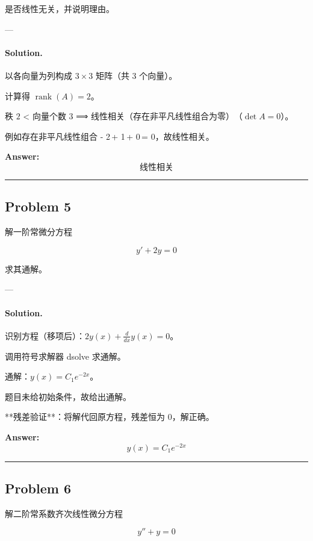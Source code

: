 \documentclass[12pt, a4paper]{article}
\newcommand{\problem}[1]{\subsection*{Problem #1}}
\newcommand{\solution}{\paragraph{Solution.}}
\begin{document}
是否线性无关，并说明理由。

---

\solution

以各向量为列构成 $3\times3$ 矩阵（共 3 个向量）。

计算得 $\operatorname{rank}(A) = 2$。

秩 $2$ < 向量个数 $3$ ⟹ 线性相关（存在非平凡线性组合为零）　（$\det A = 0$）。

例如存在非平凡线性组合 - 2\,\left[\begin{matrix}1\\2\\3\end{matrix}\right] + 1\,\left[\begin{matrix}2\\4\\6\end{matrix}\right] + 0\,\left[\begin{matrix}1\\0\\1\end{matrix}\right] = 0，故线性相关。

\textbf{Answer:}
\[\boxed{\text{线性相关}}\]

\vspace{1em}
\hrule
\vspace{1em}

\problem{5}

解一阶常微分方程

$$y' + 2y = 0$$

求其通解。

---

\solution

识别方程（移项后）：$2 y{\left(x \right)} + \frac{d}{d x} y{\left(x \right)} = 0$。

调用符号求解器 dsolve 求通解。

通解：$y{\left(x \right)} = C_{1} e^{- 2 x}$。

题目未给初始条件，故给出通解。

**残差验证**：将解代回原方程，残差恒为 0，解正确。

\textbf{Answer:}
\[\boxed{y{\left(x \right)} = C_{1} e^{- 2 x}}\]

\vspace{1em}
\hrule
\vspace{1em}

\problem{6}

解二阶常系数齐次线性微分方程

$$y'' + y = 0$$
\end{document}
